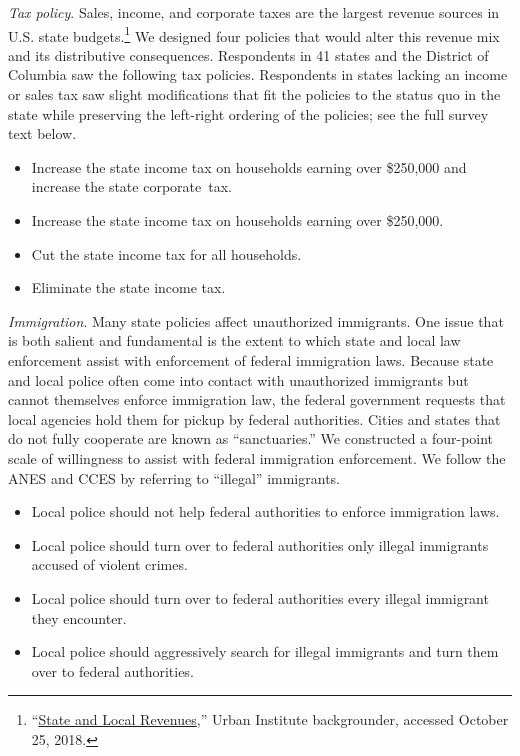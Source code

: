 \documentclass[12pt]{article}
\begin{document}
\textit{Tax policy}. Sales, income, and corporate taxes are the largest revenue sources in U.S. state budgets.\footnote{``\href{https://www.urban.org/policy-centers/cross-center-initiatives/state-local-finance-initiative/projects/state-and-local-backgrounders/state-and-local-revenues}{State and Local Revenues},'' Urban Institute backgrounder, accessed October 25, 2018.} We designed four policies that would alter this revenue mix and its distributive consequences. Respondents in 41 states and the District of Columbia saw the following tax policies. Respondents in states lacking an income or sales tax saw slight modifications that fit the policies to the status quo in the state while preserving the left-right ordering of the policies; see the full survey text below.

\begin{itemize}
\setlength\itemsep{-.25em}
\singlespacing
\item Increase the state income tax on households earning over \$250,000 and increase the state corporate~tax.
\item Increase the state income tax on households earning over \$250,000.
\item Cut the state income tax for all households.
\item Eliminate the state income tax.
\end{itemize}

\textit{Immigration}. Many state policies affect unauthorized immigrants. One issue that is both salient and fundamental is the extent to which state and local law enforcement assist with enforcement of federal immigration laws. Because state and local police often come into contact with unauthorized immigrants but cannot themselves enforce immigration law, the federal government requests that local agencies hold them for pickup by federal authorities. Cities and states that do not fully cooperate are known as ``sanctuaries.'' We constructed a four-point scale of willingness to assist with federal immigration enforcement. We follow the ANES and CCES by referring to ``illegal'' immigrants.

\begin{itemize}
\setlength\itemsep{-.25em}
\singlespacing
\item Local police should not help federal authorities to enforce immigration laws.
\item Local police should turn over to federal authorities only illegal immigrants accused of violent crimes.
\item Local police should turn over to federal authorities every illegal immigrant they encounter.
\item Local police should aggressively search for illegal immigrants and turn them over to federal authorities.
\end{itemize}
\end{document}
